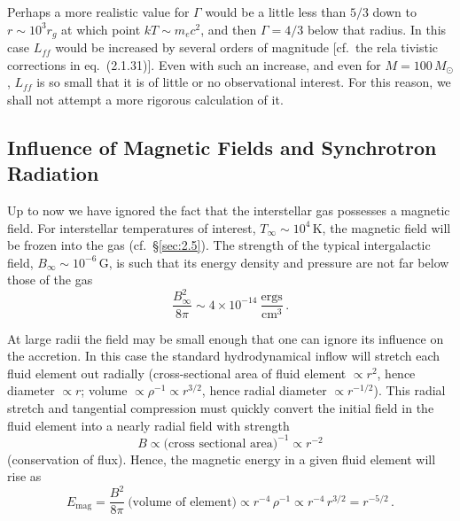 Perhaps a more realistic value for $\Gamma$ would be a little less than $5/3$ down to
$r \sim 10^3 r_g$ at which point $kT \sim m_e c^2$, and then $\Gamma = 4/3$ below that radius.  In
this case $L_{ff}$ would be increased by several orders of magnitude [cf.\ the rela%
tivistic corrections in eq.~(2.1.31)].  Even with such an increase, and even for
$M = 100\,M_\odot$, $L_{ff}$ is so small that it is of little or no observational interest.  For
this reason, we shall not attempt a more rigorous calculation of it.


\subsection{Influence of Magnetic Fields and Synchrotron Radiation}
\label{sec:4.4}

Up to now we have ignored the fact that the interstellar gas possesses a magnetic
field.  For interstellar temperatures of interest, $T_\infty \sim 10^4$\,K, the magnetic field
will be frozen into the gas (cf.\ \S\ref{sec:2.5}).  The strength of the typical intergalactic
field, $B_\infty \sim 10^{-6}$\,G, is such that its energy density and pressure are not far below
those of the gas
%
\begin{equation}
\frac{B_\infty^2}{8\pi}
\sim 4 \times 10^{-14}~\frac{\text{ergs}}{\text{cm}^3}\,.
\tag{4.4.1}
\end{equation}

At large radii the field may be small enough that one can ignore its influence on
the accretion.  In this case the standard hydrodynamical inflow will stretch each
fluid element out radially (cross-sectional area of fluid element $\propto r^2$, hence
diameter $\propto r$; volume $\propto \rho^{-1} \propto r^{3/2}$, hence radial diameter $\propto r^{-1/2}$).
This radial stretch and tangential compression must quickly convert the initial
field in the fluid element into a nearly radial field with strength
%
\begin{equation}
B \propto \text{(cross sectional area)}^{-1} \propto r^{-2}
\tag{4.4.2}
\end{equation}
%
(conservation of flux).  Hence, the magnetic energy in a given fluid element will
rise as
%
\begin{equation}
E_{\mathrm{mag}}
= \frac{B^2}{8\pi}~\text{(volume of element)}
\propto r^{-4}\,\rho^{-1}
\propto r^{-4}\,r^{3/2}
= r^{-5/2}\,.
\tag{4.4.3}
\end{equation}


